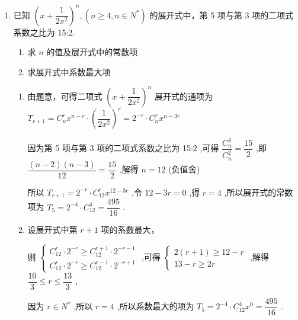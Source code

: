 \begin{enumerate}
\begin{enumerate}
        \item 已知 ${\left( x + \dfrac{1}{2{x}^{2}}\right) }^{n},\left( {n \geq  4,n \in  {{N}}^{ * }}\right)$ 的展开式中，第 5 项与第 3 项的二项式系数之比为 15:2.
        \begin{enumerate}
            \item 求 $n$ 的值及展开式中的常数项
            \item 求展开式中系数最大项
        \end{enumerate}
        \begin{jieda}
            \begin{enumerate}
                \item 由题意，可得二项式 ${\left( x + \dfrac{1}{2{x}^{2}}\right) }^{n}$ 展开式的通项为${T}_{r + 1} = {{C}}_{n}^{r}{x}^{n - r} \cdot  {\left( \dfrac{1}{2{x}^{2}}\right) }^{r} = {2}^{-r} \cdot  {{C}}_{n}^{r}{x}^{n - {3r}}$
                
                因为第 5 项与第 3 项的二项式系数之比为 15:2 ,可得 $\dfrac{{{C}}_{n}^{4}}{{{C}}_{n}^{2}} = \dfrac{15}{2}$ ,即 $\dfrac{\left( {n - 2}\right) \left( {n - 3}\right) }{12} = \dfrac{15}{2}$ ,解得 $n = {12}$ (负值舍)
                
                所以 ${T}_{r + 1} = {2}^{-r} \cdot  {{C}}_{12}^{r}{x}^{{12} - {3r}}$ ,令 ${12} - {3r} = 0$ ,得 $r = 4$ ,所以展开式的常数项为 ${T}_{5} = {2}^{-4} \cdot  {{C}}_{12}^{4} = \dfrac{495}{16}$ .
                
                \item 设展开式中第 $r + 1$ 项的系数最大，
                
                则 $\left\{  \begin{array}{l} {{C}}_{12}^{r} \cdot  {2}^{-r} \geq  {{C}}_{12}^{r + 1} \cdot  {2}^{-r - 1} \\  {{C}}_{12}^{r} \cdot  {2}^{-r} \geq  {{C}}_{12}^{r - 1} \cdot  {2}^{-r + 1} \end{array}\right.$ ,可得 $\left\{  \begin{array}{l} 2\left( {r + 1}\right)  \geq  {12} - r \\  {13} - r \geq  {2r} \end{array}\right.$ ,解得 $\dfrac{10}{3} \leq  r \leq  \dfrac{13}{3}$ ,
                
                因为 $r \in  {{N}}^{ * }$ ,所以 $r = 4$ ,所以系数最大的项为 ${T}_{5} = {2}^{-4} \cdot  {{C}}_{12}^{4}{x}^{0} = \dfrac{495}{16}$ .
            \end{enumerate}
        \end{jieda}
        

\end{enumerate}
\end{enumerate}
